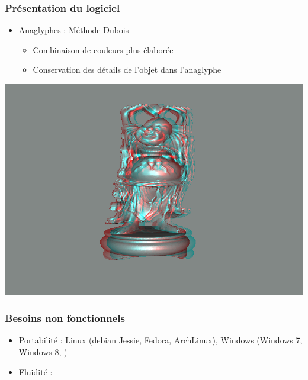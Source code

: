 \documentclass{beamer}
\begin{document}
%
\begin{frame}
\frametitle{Présentation du logiciel}
\begin{itemize}[label=$\bullet$]
\item Anaglyphes : Méthode Dubois \cite{algoDubois}
	\begin{itemize}[label=$\circ$]
	\item Combinaison de couleurs plus élaborée
	\item Conservation des détails de l'objet dans l'anaglyphe 
	\end{itemize}
\end{itemize}
\centering
\includegraphics[scale=0.35]{happy_dubois.png}

\end{frame}

\begin{frame}
\frametitle{Besoins non fonctionnels}
\begin{itemize}[label=$\bullet$]
 	\item Portabilité : Linux (debian Jessie, Fedora, ArchLinux), Windows (Windows 7, Windows 8, )
	\item Fluidité : 
\end{itemize}
\end{frame}

\end{document}
